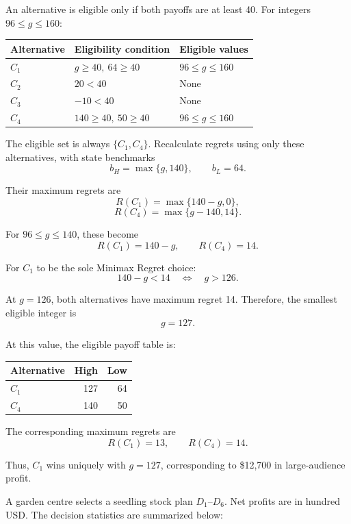 An alternative is eligible only if both payoffs
are at least 40. For integers $96\le g\le160$:

\begin{center}
	\begin{tabular}{lll}\toprule
		Alternative & Eligibility condition & Eligible values\\\midrule
		$C_1$ & $g\ge40,\ 64\ge40$ & $96\le g\le160$\\
		$C_2$ & $20<40$ & None\\
		$C_3$ & $-10<40$ & None\\
		$C_4$ & $140\ge40,\ 50\ge40$ & $96\le g\le160$\\
		\bottomrule
	\end{tabular}
\end{center}

The eligible set is always $\{C_1,C_4\}$.
Recalculate regrets using only these alternatives,
with state benchmarks
\[
b_H=\max\{g,140\},\qquad b_L=64.
\]

Their maximum regrets are
\[
R(C_1)=\max\{140-g,0\},
\]
\[
R(C_4)=\max\{g-140,14\}.
\]

For $96\le g\le140$, these become
\[
R(C_1)=140-g,\qquad R(C_4)=14.
\]

For $C_1$ to be the sole Minimax Regret choice:
\[
140-g<14
\quad\Longleftrightarrow\quad g>126.
\]

At $g=126$, both alternatives have maximum regret 14.
Therefore, the smallest eligible integer is
\[
\boxed{g=127}.
\]

At this value, the eligible payoff table is:

\begin{center}\small\setlength{\tabcolsep}{4pt}
	\begin{tabular}{lrr}\toprule
		Alternative & High & Low\\ \midrule
		$C_1$ & 127 & 64\\
		$C_4$ & 140 & 50\\
		\bottomrule
	\end{tabular}
\end{center}

The corresponding maximum regrets are
\[
R(C_1)=13,\qquad R(C_4)=14.
\]

Thus, $C_1$ wins uniquely with $g=127$,
corresponding to \$12,700 in large-audience profit.
\secInicio[sec:q2]



A garden centre selects a seedling stock plan $D_1$--$D_6$. Net profits are in hundred USD. The decision statistics are summarized below:

